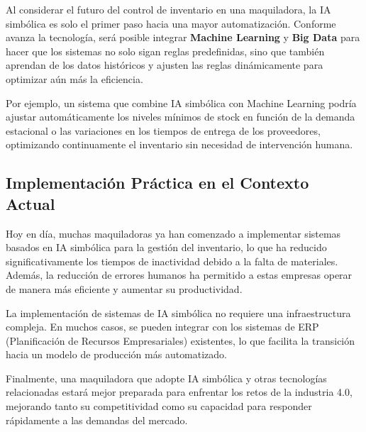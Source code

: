 Al considerar el futuro del control de inventario en una maquiladora, la IA simbólica es solo el primer paso hacia una mayor automatización. Conforme avanza la tecnología, será posible integrar \textbf{Machine Learning} y \textbf{Big Data} para hacer que los sistemas no solo sigan reglas predefinidas, sino que también aprendan de los datos históricos y ajusten las reglas dinámicamente para optimizar aún más la eficiencia.

Por ejemplo, un sistema que combine IA simbólica con Machine Learning podría ajustar automáticamente los niveles mínimos de stock en función de la demanda estacional o las variaciones en los tiempos de entrega de los proveedores, optimizando continuamente el inventario sin necesidad de intervención humana.

\subsection{Implementación Práctica en el Contexto Actual}\label{implementacion-practica}

Hoy en día, muchas maquiladoras ya han comenzado a implementar sistemas basados en IA simbólica para la gestión del inventario, lo que ha reducido significativamente los tiempos de inactividad debido a la falta de materiales. Además, la reducción de errores humanos ha permitido a estas empresas operar de manera más eficiente y aumentar su productividad.

La implementación de sistemas de IA simbólica no requiere una infraestructura compleja. En muchos casos, se pueden integrar con los sistemas de ERP (Planificación de Recursos Empresariales) existentes, lo que facilita la transición hacia un modelo de producción más automatizado. 

Finalmente, una maquiladora que adopte IA simbólica y otras tecnologías relacionadas estará mejor preparada para enfrentar los retos de la industria 4.0, mejorando tanto su competitividad como su capacidad para responder rápidamente a las demandas del mercado.

